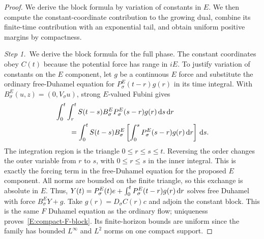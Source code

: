 \begin{proof}
  We derive the block formula by variation of constants in $E$. We then
  compute the constant-coordinate contribution to the growing dual, combine
  its finite-time contribution with an exponential tail, and obtain uniform
  positive margins by compactness.

  \medskip
  \noindent\textit{Step 1.~}We derive the block formula for the full phase.
  The constant coordinates obey $C(t)$ because the potential force has range in
  $iE$. To justify variation of constants on the $E$ component, let $g$ be a
  continuous $E$ force and substitute the ordinary free-Duhamel equation for
  $P_\sigma^E(t-r)g(r)$ in its time integral. With $B_\sigma^E(u,z) =
  (0,V_\sigma u)$, strong $E$-valued Fubini gives
  \begin{align*}
    &\int_0^t\int_r^t S(t-s)B_\sigma^E
    P_\sigma^E(s-r)g(r)\,\mathrm{d} s\,\mathrm{d} r\\
    &\qquad=\int_0^tS(t-s)B_\sigma^E
    \left[\int_0^sP_\sigma^E(s-r)g(r)\,\mathrm{d} r\right]\,\mathrm{d} s.
  \end{align*}
  The integration region is the triangle $0 \le r \le s \le t$. Reversing the
  order changes the outer variable from $r$ to $s$, with $0 \le r \le s$ in
  the inner integral. This is exactly the forcing term in the free-Duhamel
  equation for the proposed $E$ component.
  All norms are bounded on the finite triangle, so this exchange is absolute in
  $E$. Thus, $Y(t) = P_\sigma^E(t)e+\int_0^tP_\sigma^E(t-r)g(r)\,\mathrm{d} r$ solves
  free Duhamel with force $B_\sigma^EY+g$. Take $g(r) = D_\sigma C(r)c$ and
  adjoin the constant block. This is the same $F$ Duhamel equation as the
  ordinary flow; uniqueness proves~\eqref{E:compact-F-block}. Its finite-horizon
  bounds are uniform since the family has bounded $L^\infty$ and $L^2$ norms on
  one compact support.


\end{proof}
